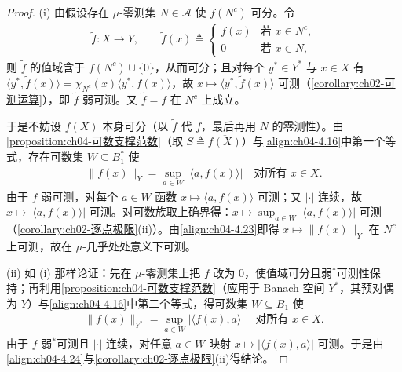 \documentclass[../../main.tex]{subfiles}%
\begin{document}
\begin{proof}
(i) 由假设存在 $\mu$-零测集 $N\in\mathcal{A}$ 使 $f(N^c)$ 可分。令
\begin{align*}
\tilde f:X\to Y,\qquad \tilde f(x)\triangleq\begin{cases}f(x)&\text{若 }x\in N^c,\\ 0&\text{若 }x\in N,\end{cases}
\end{align*}
则 $\tilde f$ 的值域含于 $f(N^c)\cup\{0\}$，从而可分；且对每个 $y^*\in Y^*$ 与 $x\in X$ 有 $\langle y^*,\tilde f(x)\rangle=\chi_{N^c}(x)\langle y^*,f(x)\rangle$，故 $x\mapsto\langle y^*,\tilde f(x)\rangle$ 可测（\cref{corollary:ch02-可测运算}），即 $\tilde f$ 弱可测。又 $\tilde f=f$ 在 $N^c$ 上成立。

于是不妨设 $f(X)$ 本身可分（以 $\tilde f$ 代 $f$，最后再用 $N$ 的零测性）。由\cref{proposition:ch04-可数支撑范数}（取 $S\triangleq\overline{f(X)}$）与\eqref{align:ch04-4.16}中第一个等式，存在可数集 $W\subseteq B_1^*$ 使
\begin{align}
\|f(x)\|_Y=\sup_{a\in W}|\langle a,f(x)\rangle|\quad\text{对所有 }x\in X. \label{align:ch04-4.23}
\end{align}
由于 $f$ 弱可测，对每个 $a\in W$ 函数 $x\mapsto\langle a,f(x)\rangle$ 可测；又 $|\cdot|$ 连续，故 $x\mapsto|\langle a,f(x)\rangle|$ 可测。对可数族取上确界得：$x\mapsto\sup_{a\in W}|\langle a,f(x)\rangle|$ 可测（\cref{corollary:ch02-逐点极限}(ii)）。由\eqref{align:ch04-4.23}即得 $x\mapsto\|f(x)\|_Y$ 在 $N^c$ 上可测，故在 $\mu$-几乎处处意义下可测。

(ii) 如 (i) 那样论证：先在 $\mu$-零测集上把 $f$ 改为 $0$，使值域可分且弱$^*$可测性保持；再利用\cref{proposition:ch04-可数支撑范数}（应用于 Banach 空间 $Y^*$，其预对偶为 $Y$）与\eqref{align:ch04-4.16}中第二个等式，得可数集 $W\subseteq B_1$ 使
\begin{align}
\|f(x)\|_{Y^*}=\sup_{a\in W}|\langle f(x),a\rangle|\quad\text{对所有 }x\in X. \label{align:ch04-4.24}
\end{align}
由于 $f$ 弱$^*$可测且 $|\cdot|$ 连续，对任意 $a\in W$ 映射 $x\mapsto|\langle f(x),a\rangle|$ 可测。于是由\eqref{align:ch04-4.24}与\cref{corollary:ch02-逐点极限}(ii)得结论。
\end{proof}
\end{document}
